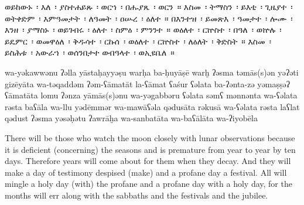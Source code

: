 
\clearpage
\begin{ethiopictext}
    ወይከውኑ~፡ እለ~፡ ያስተሐይጹ~፡ ወርኀ~፡
    በሑያጼ~፡ ወርን~። እስመ~፡ ትማስን~፡ ይእቲ~፡ ጊዜያተ~፡ ወትቀድም~፡
    እምዓመታት~፡ ለዓመት~፡ ዐሡረ~፡ ዕለተ~።
    በእንተዝ~፡ ይመጽእ~፡
    ዓመታተ~፡ ሎሙ~፡ እንዘ~፡ ያማስኑ~፡ ወይገብሩ~፡ ዕለተ~፡ ስምዕ~፡
    ምንንተ~። ወዕለተ~፡ ርኵስተ~፡ በዓለ~፡ ወኵሉ~፡ ይዴምር~፡ ወመዋዕለ~፡ 
    ቅዱሳተ~፡ ርኩሰ~፡ ወዕለተ~፡ ርኵስተ~፡ ለዕለት~፡ ቅድስት~። እስመ~፡
    ይስሕቱ~፡ አውራኀ~፡ ወሰንበታተ ወብዓላተ~፡ ወኢዩቤለ~።
\end{ethiopictext}
\begin{transliteration}
    wa-yəkawwənu ʔəlla yāstaḥayyəṣu warḥa 
    ba-ḥuyāṣē warḫ ʔəsma təmās(s)ən yəʔəti gizēyāta wa-təqaddəm 
    ʔəm-ʕāmatāt la-ʕāmat ʕaśur ʕəlata
    ba-ʔənta-zə yəmaṣṣəʔ 
    ʕāmatāta lomu ʔənza yāmās(s)ənu wa-yəgabbəru ʕəlata səmʕ 
    mənnənta wa-ʕəlata rəsta baʕāla wa-llu yədēmmər wa-mawāʕəla 
    qədusāta rəkusā wa-ʕəlata rəsta laʕlat qədust ʔəsma
    yəsəḥətu ʔawrāḫa wa-sanbatāta wa-baʕālāta wa-ʔiyobēla
\end{transliteration}
\begin{translation}
    There will be those who watch the moon closely with lunar observations
    because it is deficient (concerning) the seasons and is premature from year to year by ten days. 
    Therefore
    years will come about for them when they decay. And they will make a day of
    testimony despised (make) and a profane day a festival. All will mingle a holy day
    (with) the profane and a profane day with a holy day, for
    the months will err along with the sabbaths and the festivals and the jubilee.
\end{translation}